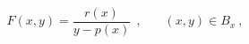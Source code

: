 \begin{equation}
F(x,y)  =
\frac{r(x)}{y - p(x)}\ \ ,\ \ \ \ \ \ \ \ (x,y) \in B_x\ ,
\label{2.6}
\end{equation}

